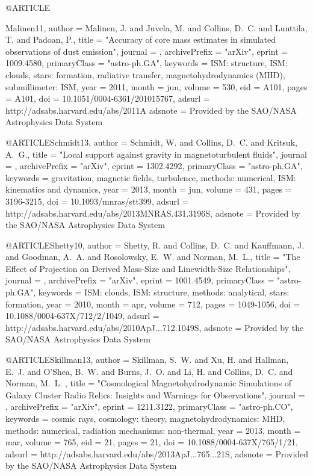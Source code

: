 @ARTICLE{Malinen11,
   author = {{Malinen}, J. and {Juvela}, M. and {Collins}, D.~C. and {Lunttila}, T. and 
	{Padoan}, P.},
    title = "{Accuracy of core mass estimates in simulated observations of dust emission}",
  journal = {\aap},
archivePrefix = "arXiv",
   eprint = {1009.4580},
 primaryClass = "astro-ph.GA",
 keywords = {ISM: structure, ISM: clouds, stars: formation, radiative transfer, magnetohydrodynamics (MHD), submillimeter: ISM},
     year = 2011,
    month = jun,
   volume = 530,
      eid = {A101},
    pages = {A101},
      doi = {10.1051/0004-6361/201015767},
   adsurl = {http://adsabs.harvard.edu/abs/2011A%
  adsnote = {Provided by the SAO/NASA Astrophysics Data System}
}

@ARTICLE{Schmidt13,
   author = {{Schmidt}, W. and {Collins}, D.~C. and {Kritsuk}, A.~G.},
    title = "{Local support against gravity in magnetoturbulent fluids}",
  journal = {\mnras},
archivePrefix = "arXiv",
   eprint = {1302.4292},
 primaryClass = "astro-ph.GA",
 keywords = {gravitation, magnetic fields, turbulence, methods: numerical, ISM: kinematics and dynamics},
     year = 2013,
    month = jun,
   volume = 431,
    pages = {3196-3215},
      doi = {10.1093/mnras/stt399},
   adsurl = {http://adsabs.harvard.edu/abs/2013MNRAS.431.3196S},
  adsnote = {Provided by the SAO/NASA Astrophysics Data System}
}

@ARTICLE{Shetty10,
   author = {{Shetty}, R. and {Collins}, D.~C. and {Kauffmann}, J. and {Goodman}, A.~A. and 
	{Rosolowsky}, E.~W. and {Norman}, M.~L.},
    title = "{The Effect of Projection on Derived Mass-Size and Linewidth-Size Relationships}",
  journal = {\apj},
archivePrefix = "arXiv",
   eprint = {1001.4549},
 primaryClass = "astro-ph.GA",
 keywords = {ISM: clouds, ISM: structure, methods: analytical, stars: formation},
     year = 2010,
    month = apr,
   volume = 712,
    pages = {1049-1056},
      doi = {10.1088/0004-637X/712/2/1049},
   adsurl = {http://adsabs.harvard.edu/abs/2010ApJ...712.1049S},
  adsnote = {Provided by the SAO/NASA Astrophysics Data System}
}

@ARTICLE{Skillman13,
   author = {{Skillman}, S.~W. and {Xu}, H. and {Hallman}, E.~J. and {O'Shea}, B.~W. and 
	{Burns}, J.~O. and {Li}, H. and {Collins}, D.~C. and {Norman}, M.~L.
	},
    title = "{Cosmological Magnetohydrodynamic Simulations of Galaxy Cluster Radio Relics: Insights and Warnings for Observations}",
  journal = {\apj},
archivePrefix = "arXiv",
   eprint = {1211.3122},
 primaryClass = "astro-ph.CO",
 keywords = {cosmic rays, cosmology: theory, magnetohydrodynamics: MHD, methods: numerical, radiation mechanisms: non-thermal},
     year = 2013,
    month = mar,
   volume = 765,
      eid = {21},
    pages = {21},
      doi = {10.1088/0004-637X/765/1/21},
   adsurl = {http://adsabs.harvard.edu/abs/2013ApJ...765...21S},
  adsnote = {Provided by the SAO/NASA Astrophysics Data System}
}

}
